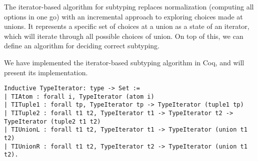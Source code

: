 \documentclass[a4paper,UKenglish]{lipics-v2018}
\begin{document}
The iterator-based algorithm for subtyping replaces normalization (computing all options
in one go) with an incremental approach to exploring choices made at unions. It represents
a specific set of choices at a union as a state of an iterator, which will iterate through
all possible choices of union. On top of this, we can define an algorithm for deciding correct
subtyping.

We have implemented the iterator-based subtyping algorithm in Coq, and will
present its implementation.

\begin{verbatim}
Inductive TypeIterator: type -> Set :=
| TIAtom : forall i, TypeIterator (atom i)
| TITuple1 : forall tp, TypeIterator tp -> TypeIterator (tuple1 tp)
| TITuple2 : forall t1 t2, TypeIterator t1 -> TypeIterator t2 -> TypeIterator (tuple2 t1 t2)
| TIUnionL : forall t1 t2, TypeIterator t1 -> TypeIterator (union t1 t2)
| TIUnionR : forall t1 t2, TypeIterator t2 -> TypeIterator (union t1 t2).
\end{verbatim}
\end{document}
